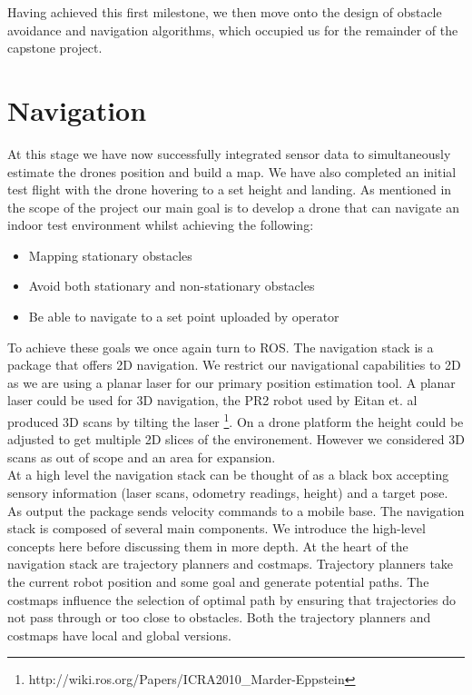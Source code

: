 \documentclass[capstone_report.tex]{subfiles}
\begin{document}
Having achieved this first milestone, we then move onto the design of obstacle avoidance and navigation algorithms, which occupied us for the remainder of the capstone project.

\section{Navigation}

At this stage we have now successfully integrated sensor data to simultaneously estimate the drones position and build a map.  We have also completed an initial test flight with the drone hovering to a set height and landing.  As mentioned in the scope of the project our main goal is to develop a drone that can navigate an indoor test environment whilst achieving the following:

\begin{itemize}
    \item Mapping stationary obstacles
    \item Avoid both stationary and non-stationary obstacles
    \item Be able to navigate to a set point uploaded by operator
\end{itemize}


To achieve these goals we once again turn to ROS.  The navigation stack is a package that offers 2D navigation.  We restrict our navigational capabilities to 2D as we are using a planar laser for our primary position estimation tool.  A planar laser could be used for 3D navigation, the PR2 robot used by Eitan et. al produced 3D scans by tilting the laser \footnote{http://wiki.ros.org/Papers/ICRA2010\_Marder-Eppstein}.  On a drone platform the height could be adjusted to get multiple 2D slices of the environement.  However we considered 3D scans as out of scope and an area for expansion. \\

At a high level the navigation stack can be thought of as a black box accepting sensory information (laser scans, odometry readings, height) and a target pose.  As output the package sends velocity commands to a mobile base.  The navigation stack is composed of several main components.  We introduce the high-level concepts here before discussing them in more depth.  At the heart of the navigation stack are trajectory planners and costmaps.  Trajectory planners take the current robot position and some goal and generate potential paths.  The costmaps influence the selection of optimal path by ensuring that trajectories do not pass through or too close to obstacles.  Both the trajectory planners and costmaps have local and global versions.\\
\end{document}
